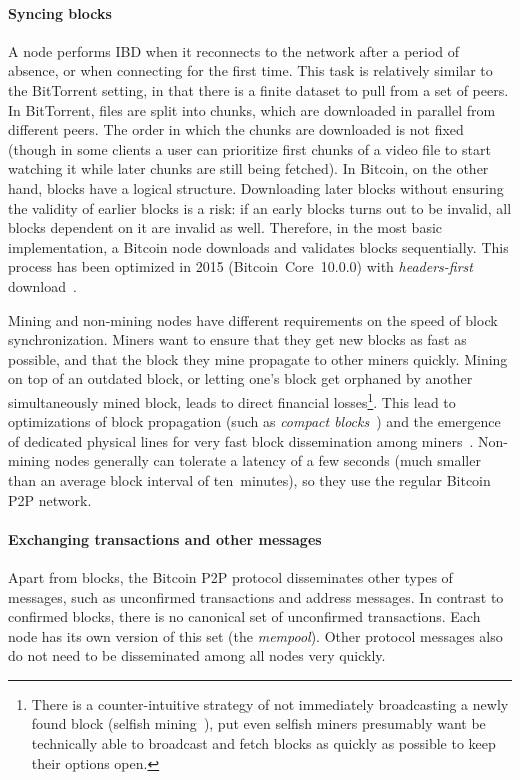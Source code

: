 \paragraph{Syncing blocks}
A node performs IBD when it reconnects to the network after a period of absence, or when connecting for the first time.
This task is relatively similar to the BitTorrent setting, in that there is a finite dataset to pull from a set of peers.
In BitTorrent, files are split into chunks, which are downloaded in parallel from different peers.
The order in which the chunks are downloaded is not fixed (though in some clients a user can prioritize first chunks of a video file to start watching it while later chunks are still being fetched).
In Bitcoin, on the other hand, blocks have a logical structure.
Downloading later blocks without ensuring the validity of earlier blocks is a risk: if an early blocks turns out to be invalid, all blocks dependent on it are invalid as well.
Therefore, in the most basic implementation, a Bitcoin node downloads and validates blocks sequentially.
This process has been optimized in 2015 (Bitcoin~Core~10.0.0) with \textit{headers-first} download~\cite{Core2015}.

Mining and non-mining nodes have different requirements on the speed of block synchronization.
Miners want to ensure that they get new blocks as fast as possible, and that the block they mine propagate to other miners quickly.
Mining on top of an outdated block, or letting one's block get orphaned by another simultaneously mined block, leads to direct financial losses\footnote{There is a counter-intuitive strategy of not immediately broadcasting a newly found block (selfish mining~\cite{Eyal2018}), put even selfish miners presumably want be technically able to broadcast and fetch blocks as quickly as possible to keep their options open.}.
This lead to optimizations of block propagation (such as \textit{compact blocks}~\cite{Core2016}) and the emergence of dedicated physical lines for very fast block dissemination among miners~\cite{FALCON, FIBRE}.
Non-mining nodes generally can tolerate a latency of a few seconds (much smaller than an average block interval of ten~minutes), so they use the regular Bitcoin P2P network.
	

\paragraph{Exchanging transactions and other messages}
Apart from blocks, the Bitcoin P2P protocol disseminates other types of messages, such as unconfirmed transactions and address messages.
In contrast to confirmed blocks, there is no canonical set of unconfirmed transactions.
Each node has its own version of this set (the \textit{mempool}).
Other protocol messages also do not need to be disseminated among all nodes very quickly.

